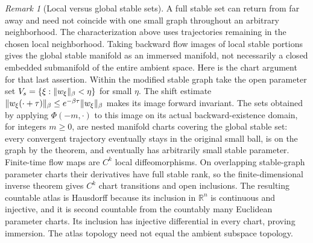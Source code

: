 \documentclass[11pt,oneside]{book}
\theoremstyle{definition}
\theoremstyle{remark}\newtheorem{remark}[theorem]{Remark}
\newcommand{\R}{\mathbb R}\newcommand{\C}{\mathbb C}
\begin{document}
\begin{remark}[Local versus global stable sets]\label{d13:20:local-global}
A full stable set can return from far away and need not coincide with
one small graph throughout an arbitrary neighborhood. The characterization
above uses trajectories remaining in the chosen local neighborhood.
Taking backward flow images of local stable portions gives the global
stable manifold as an immersed manifold, not necessarily a closed
embedded submanifold of the entire ambient space.
Here is the chart argument for that last assertion. Within the modified
stable graph take the open parameter set
$V_s=\{\xi:\lVert w_\xi\rVert_\beta<\eta\}$ for small $\eta$.
The shift estimate
$\lVert w_\xi(\cdot+\tau)\rVert_\beta\leq e^{-\beta\tau}\lVert w_\xi\rVert_\beta$
makes its image forward invariant. The sets obtained by applying
$\Phi(-m,\cdot)$ to this image on its actual backward-existence domain,
for integers $m\geq0$, are nested
manifold charts covering the global stable set: every convergent
trajectory eventually stays in the original small ball, is on the graph
by the theorem, and eventually has arbitrarily small stable parameter.
Finite-time flow maps are $C^k$ local diffeomorphisms. On overlapping
stable-graph parameter charts their derivatives have full stable rank,
so the finite-dimensional inverse theorem gives $C^k$ chart transitions
and open inclusions. The resulting countable atlas is Hausdorff because
its inclusion in $\R^n$ is continuous and injective, and it is second
countable from the countably many Euclidean parameter charts. Its
inclusion has injective differential in every chart, proving immersion.
The atlas topology need not equal the ambient subspace topology.
\end{remark}
\end{document}
